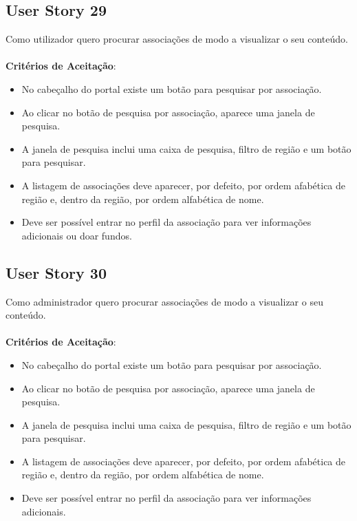 \documentclass[a4paper,11pt]{article}
\begin{document}
\subsection{User Story 29}
Como utilizador quero procurar associações de modo a visualizar o seu conteúdo.\\\\
\textbf{Critérios de Aceitação}:
\begin{itemize}
  \item No cabeçalho do portal existe um botão para pesquisar por associação.
  \item Ao clicar no botão de pesquisa por associação, aparece uma janela de pesquisa.
  \item A janela de pesquisa inclui uma caixa de pesquisa, filtro de região e um botão para pesquisar.
  \item A listagem de associações deve aparecer, por defeito, por ordem afabética de região e, dentro da região, por ordem alfabética de nome.
  \item Deve ser possível entrar no perfil da associação para ver informações adicionais ou doar fundos.
\end{itemize}

\subsection{User Story 30}
Como administrador quero procurar associações de modo a visualizar o seu conteúdo.\\\\
\textbf{Critérios de Aceitação}:
\begin{itemize}
  \item No cabeçalho do portal existe um botão para pesquisar por associação.
  \item Ao clicar no botão de pesquisa por associação, aparece uma janela de pesquisa.
  \item A janela de pesquisa inclui uma caixa de pesquisa, filtro de região e um botão para pesquisar.
  \item A listagem de associações deve aparecer, por defeito, por ordem afabética de região e, dentro da região, por ordem alfabética de nome.
  \item Deve ser possível entrar no perfil da associação para ver informações adicionais.
\end{itemize}
\end{document}
